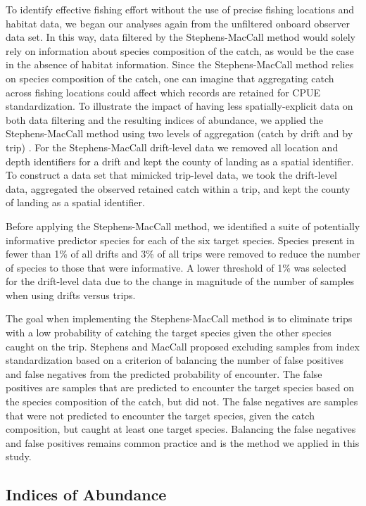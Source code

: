 \documentclass[
  12pt,
  authoryear,
  preprint,
  3p]{elsarticle}
\begin{document}
To identify effective fishing effort without the use of precise fishing
locations and habitat data, we began our analyses again from the
unfiltered onboard observer data set. In this way, data filtered by the
Stephens-MacCall method would solely rely on information about species
composition of the catch, as would be the case in the absence of habitat
information. Since the Stephens-MacCall method relies on species
composition of the catch, one can imagine that aggregating catch across
fishing locations could affect which records are retained for CPUE
standardization. To illustrate the impact of having less
spatially-explicit data on both data filtering and the resulting indices
of abundance, we applied the Stephens-MacCall method using two levels of
aggregation (catch by drift and by trip)
\citeyearpar{Stephens:2004:MAS}. For the Stephens-MacCall drift-level
data we removed all location and depth identifiers for a drift and kept
the county of landing as a spatial identifier. To construct a data set
that mimicked trip-level data, we took the drift-level data, aggregated
the observed retained catch within a trip, and kept the county of
landing as a spatial identifier.

Before applying the Stephens-MacCall method, we identified a suite of
potentially informative predictor species for each of the six target
species. Species present in fewer than 1\% of all drifts and 3\% of all
trips were removed to reduce the number of species to those that were
informative. A lower threshold of 1\% was selected for the drift-level
data due to the change in magnitude of the number of samples when using
drifts versus trips.

The goal when implementing the Stephens-MacCall method is to eliminate
trips with a low probability of catching the target species given the
other species caught on the trip. Stephens and MacCall proposed
excluding samples from index standardization based on a criterion of
balancing the number of false positives and false negatives from the
predicted probability of encounter. The false positives are samples that
are predicted to encounter the target species based on the species
composition of the catch, but did not. The false negatives are samples
that were not predicted to encounter the target species, given the catch
composition, but caught at least one target species. Balancing the false
negatives and false positives remains common practice and is the method
we applied in this study.

\hypertarget{indices-of-abundance}{%
\subsection{Indices of Abundance}\label{indices-of-abundance}}
\end{document}
